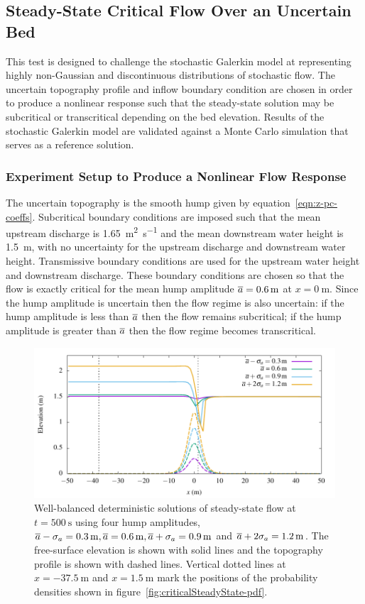 \subsection{Steady-State Critical Flow Over an Uncertain Bed}

This test is designed to challenge the stochastic Galerkin model at representing highly non-Gaussian and discontinuous distributions of stochastic flow.
The uncertain topography profile and inflow boundary condition are chosen in order to produce a nonlinear response such that the steady-state solution may be subcritical or transcritical depending on the bed elevation.
Results of the stochastic Galerkin model are validated against a Monte Carlo simulation that serves as a reference solution.

\subsubsection{Experiment Setup to Produce a Nonlinear Flow Response}
The uncertain topography is the smooth hump given by equation~\eqref{eqn:z-pc-coeffs}.
Subcritical boundary conditions are imposed such that the mean upstream discharge is \SI{1.65}{\meter\squared\per\second} and the mean downstream water height is \SI{1.5}{\meter}, with no uncertainty for the upstream discharge and downstream water height.
Transmissive boundary conditions are used for the upstream water height and downstream discharge.
These boundary conditions are chosen so that the flow is exactly critical for the mean hump amplitude $\overline{a} = \SI{0.6}{\meter}$ at $x = \SI{0}{\meter}$.
Since the hump amplitude is uncertain then the flow regime is also uncertain: if the hump amplitude is less than $\overline{a}$ then the flow remains subcritical; if the hump amplitude is greater than $\overline{a}$ then the flow regime becomes transcritical.

\begin{figure}
    \centering
    \includegraphics{fig-criticalSteadyState-examples.pdf}
    \caption{Well-balanced deterministic solutions of steady-state flow at $t = \SI{500}{\second}$ using four hump amplitudes, $\overline{a} - \sigma_a = \SI{0.3}{\meter}, \overline{a} = \SI{0.6}{\meter}, \overline{a}+\sigma_a = \SI{0.9}{\meter}$ and $\overline{a} + 2\sigma_a = \SI{1.2}{\meter}$.
    The free-surface elevation is shown with solid lines and the topography profile is shown with dashed lines.
    Vertical dotted lines at $x = \SI{-37.5}{\meter}$ and $x = \SI{1.5}{\meter}$ mark the positions of the probability densities shown in figure~\ref{fig:criticalSteadyState-pdf}.}
    \label{fig:criticalSteadyState-examples}
\end{figure}

